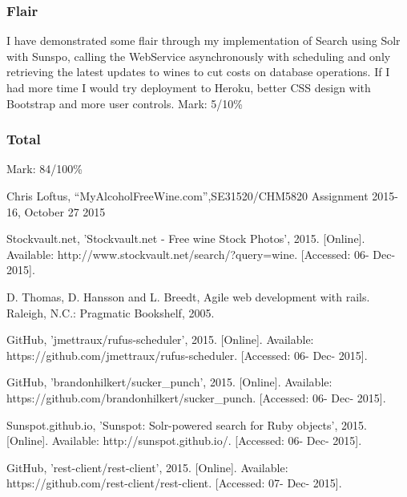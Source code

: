 \documentclass[12pt]{article}
\begin{document}
\subsubsection{Flair}
I have demonstrated some flair through my implementation of Search using Solr with Sunspo, calling the WebService asynchronously with scheduling and only retrieving the latest updates to wines to cut costs on database operations. If I had more time I would try deployment to Heroku, better CSS design with Bootstrap and more user controls.
\newline
Mark: 5/10\%

\subsubsection{Total}
Mark: 84/100\%



\clearpage


\begin{thebibliography}{5}

 Chris Loftus, ``MyAlcoholFreeWine.com'',SE31520/CHM5820 Assignment 2015-16, October 27 2015

 Stockvault.net, 'Stockvault.net - Free wine Stock Photos', 2015. [Online]. Available: http://www.stockvault.net/search/?query=wine. [Accessed: 06- Dec- 2015].

 D. Thomas, D. Hansson and L. Breedt, Agile web development with rails. Raleigh, N.C.: Pragmatic Bookshelf, 2005.

 GitHub, 'jmettraux/rufus-scheduler', 2015. [Online]. Available: https://github.com/jmettraux/rufus-scheduler. [Accessed: 06- Dec- 2015].

 GitHub, 'brandonhilkert/sucker\_punch', 2015. [Online]. Available: https://github.com/brandonhilkert/sucker\_punch. [Accessed: 06- Dec- 2015].

  Sunspot.github.io, 'Sunspot: Solr-powered search for Ruby objects', 2015. [Online]. Available: http://sunspot.github.io/. [Accessed: 06- Dec- 2015].

 GitHub, 'rest-client/rest-client', 2015. [Online]. Available: https://github.com/rest-client/rest-client. [Accessed: 07- Dec- 2015].

\end{thebibliography}
\end{document}

